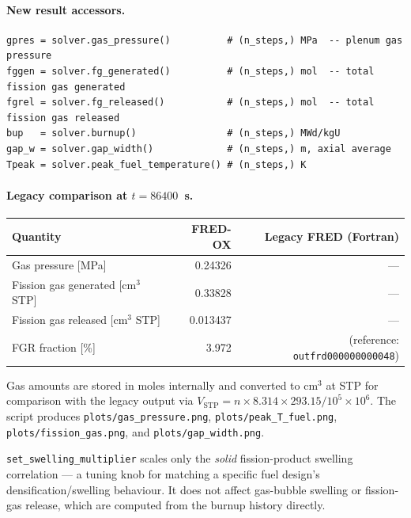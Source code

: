 \documentclass[11pt,a4paper]{article}
\begin{document}
\paragraph{New result accessors.}

\begin{lstlisting}
gpres = solver.gas_pressure()          # (n_steps,) MPa  -- plenum gas pressure
fggen = solver.fg_generated()          # (n_steps,) mol  -- total fission gas generated
fgrel = solver.fg_released()           # (n_steps,) mol  -- total fission gas released
bup   = solver.burnup()                # (n_steps,) MWd/kgU
gap_w = solver.gap_width()             # (n_steps,) m, axial average
Tpeak = solver.peak_fuel_temperature() # (n_steps,) K
\end{lstlisting}

\paragraph{Legacy comparison at $t=86400$~s.}

\begin{center}
\begin{tabular}{lrr}
\toprule
Quantity & FRED-OX & Legacy FRED (Fortran) \\
\midrule
Gas pressure [MPa]                 & 0.24326 & --- \\
Fission gas generated [cm$^3$ STP] & 0.33828 & --- \\
Fission gas released [cm$^3$ STP]  & 0.013437 & --- \\
FGR fraction [\%]                  & 3.972 & (reference: \texttt{outfrd000000000048}) \\
\bottomrule
\end{tabular}
\end{center}

Gas amounts are stored in moles internally and converted to cm$^3$ at STP for
comparison with the legacy output via
$V_\text{STP} = n \times 8.314 \times 293.15 / 10^5 \times 10^6$.  The script
produces \texttt{plots/gas\_pressure.png}, \texttt{plots/peak\_T\_fuel.png},
\texttt{plots/fission\_gas.png}, and \texttt{plots/gap\_width.png}.

\begin{infobox}
  \texttt{set\_swelling\_multiplier} scales only the \emph{solid}
  fission-product swelling correlation --- a tuning knob for matching a
  specific fuel design's densification/swelling behaviour.  It does not
  affect gas-bubble swelling or fission-gas release, which are computed from
  the burnup history directly.
\end{infobox}
\end{document}
